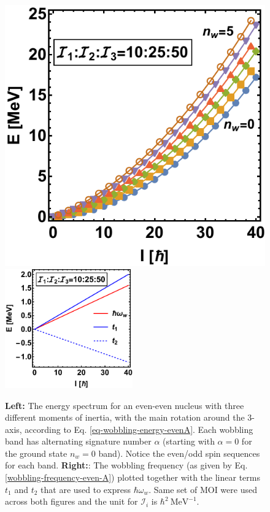 \begin{figure}
    \centering
    \includegraphics[scale=0.755]{Chapters/Figures/wobblingFreq-evenA.pdf}
    \includegraphics[width=0.49\textwidth]{Chapters/Figures/wobbling-evenA.pdf}
    \caption{\textbf{Left:} The energy spectrum for an even-even nucleus with three different moments of inertia, with the main rotation around the $3$-axis, according to Eq. \ref{eq-wobbling-energy-evenA}. Each wobbling band has alternating signature number $\alpha$ (starting with $\alpha=0$ for the ground state $n_w=0$ band). Notice the even/odd spin sequences for each band. \textbf{Right:}: The wobbling frequency (as given by Eq. \ref{wobbling-frequency-even-A}) plotted together with the linear terms $t_1$ and $t_2$ that are used to express $\hbar\omega_w$. Same set of MOI were used across both figures and the unit for $\mathcal{I}_i$ is $\hbar^2\ \text{MeV}^{-1}$.}
    \label{fig-even-even-wobbling-energies}
\end{figure}

